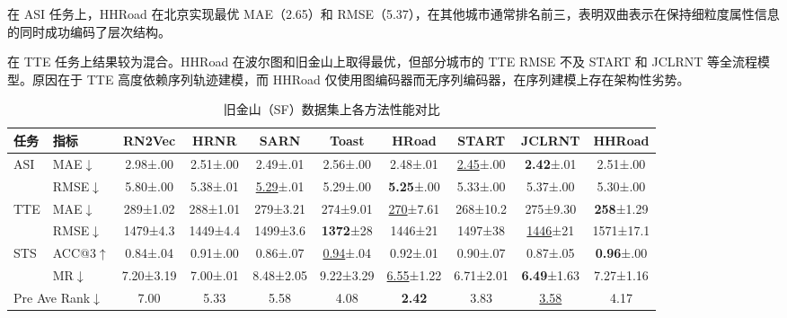 在 ASI 任务上，HHRoad 在北京实现最优 MAE（2.65）和 RMSE（5.37），在其他城市通常排名前三，表明双曲表示在保持细粒度属性信息的同时成功编码了层次结构。

在 TTE 任务上结果较为混合。HHRoad 在波尔图和旧金山上取得最优，但部分城市的 TTE RMSE 不及 START 和 JCLRNT 等全流程模型。原因在于 TTE 高度依赖序列轨迹建模，而 HHRoad 仅使用图编码器而无序列编码器，在序列建模上存在架构性劣势。
\begin{table}[H]
    \centering
    \caption{旧金山（SF）数据集上各方法性能对比}
    \label{tab:HHRoad_sf}
    \small
    \setlength{\tabcolsep}{4pt}
    \renewcommand{\arraystretch}{1.2}
    \begin{tabular}{llcccccccc}
        \toprule
        \textbf{任务} & \textbf{指标}
            & \textbf{RN2Vec} & \textbf{HRNR} & \textbf{SARN}
            & \textbf{Toast} & \textbf{HRoad} & \textbf{START}
            & \textbf{JCLRNT} & \textbf{HHRoad} \\
        \midrule
        \multirow{2}{*}{ASI}
            & MAE$\downarrow$
            & 2.98\tiny{±.00} & 2.51\tiny{±.00} & 2.49\tiny{±.01}
            & 2.56\tiny{±.00} & 2.48\tiny{±.01} & \underline{2.45}\tiny{±.00}
            & \textbf{2.42}\tiny{±.01} & 2.51\tiny{±.00} \\
            & RMSE$\downarrow$
            & 5.80\tiny{±.00} & 5.38\tiny{±.01} & \underline{5.29}\tiny{±.01}
            & 5.29\tiny{±.00} & \textbf{5.25}\tiny{±.00} & 5.33\tiny{±.00}
            & 5.37\tiny{±.00} & 5.30\tiny{±.00} \\
        \cmidrule(lr){1-10}
        \multirow{2}{*}{TTE}
            & MAE$\downarrow$
            & 289\tiny{±1.02} & 288\tiny{±1.01} & 279\tiny{±3.21}
            & 274\tiny{±9.01} & \underline{270}\tiny{±7.61} & 268\tiny{±10.2}
            & 275\tiny{±9.30} & \textbf{258}\tiny{±1.29} \\
            & RMSE$\downarrow$
            & 1479\tiny{±4.3} & 1449\tiny{±4.4} & 1499\tiny{±3.6}
            & \textbf{1372}\tiny{±28} & 1446\tiny{±21} & 1497\tiny{±38}
            & \underline{1446}\tiny{±21} & 1571\tiny{±17.1} \\
        \cmidrule(lr){1-10}
        \multirow{2}{*}{STS}
            & ACC@3$\uparrow$
            & 0.84\tiny{±.04} & 0.91\tiny{±.00} & 0.86\tiny{±.07}
            & \underline{0.94}\tiny{±.04} & 0.92\tiny{±.01} & 0.90\tiny{±.07}
            & 0.87\tiny{±.05} & \textbf{0.96}\tiny{±.00} \\
            & MR$\downarrow$
            & 7.20\tiny{±3.19} & 7.00\tiny{±.01} & 8.48\tiny{±2.05}
            & 9.22\tiny{±3.29} & \underline{6.55}\tiny{±1.22} & 6.71\tiny{±2.01}
            & \textbf{6.49}\tiny{±1.63} & 7.27\tiny{±1.16} \\
        \midrule
        \multicolumn{2}{l}{Pre Ave Rank$\downarrow$}
            & 7.00 & 5.33 & 5.58 & 4.08 & \textbf{2.42} & 3.83 & \underline{3.58} & 4.17 \\
        \bottomrule
    \end{tabular}
\end{table}


